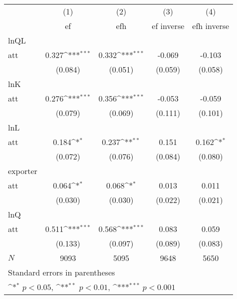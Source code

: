 {
\def\sym#1{\ifmmode^{#1}\else\(^{#1}\)\fi}
\begin{tabular}{l*{4}{c}}
\hline\hline
            &\multicolumn{1}{c}{(1)}&\multicolumn{1}{c}{(2)}&\multicolumn{1}{c}{(3)}&\multicolumn{1}{c}{(4)}\\
            &\multicolumn{1}{c}{ef}&\multicolumn{1}{c}{efh}&\multicolumn{1}{c}{ef inverse}&\multicolumn{1}{c}{efh inverse}\\
\hline
lnQL        &                     &                     &                     &                     \\
att         &       0.327\sym{***}&       0.332\sym{***}&      -0.069         &      -0.103         \\
            &     (0.084)         &     (0.051)         &     (0.059)         &     (0.058)         \\
\hline
lnK         &                     &                     &                     &                     \\
att         &       0.276\sym{***}&       0.356\sym{***}&      -0.053         &      -0.059         \\
            &     (0.079)         &     (0.069)         &     (0.111)         &     (0.101)         \\
\hline
lnL         &                     &                     &                     &                     \\
att         &       0.184\sym{*}  &       0.237\sym{**} &       0.151         &       0.162\sym{*}  \\
            &     (0.072)         &     (0.076)         &     (0.084)         &     (0.080)         \\
\hline
exporter    &                     &                     &                     &                     \\
att         &       0.064\sym{*}  &       0.068\sym{*}  &       0.013         &       0.011         \\
            &     (0.030)         &     (0.030)         &     (0.022)         &     (0.021)         \\
\hline
lnQ         &                     &                     &                     &                     \\
att         &       0.511\sym{***}&       0.568\sym{***}&       0.083         &       0.059         \\
            &     (0.133)         &     (0.097)         &     (0.089)         &     (0.083)         \\
\hline
\(N\)       &        9093         &        5095         &        9648         &        5650         \\
\hline\hline
\multicolumn{5}{l}{\footnotesize Standard errors in parentheses}\\
\multicolumn{5}{l}{\footnotesize \sym{*} \(p<0.05\), \sym{**} \(p<0.01\), \sym{***} \(p<0.001\)}\\
\end{tabular}
}
